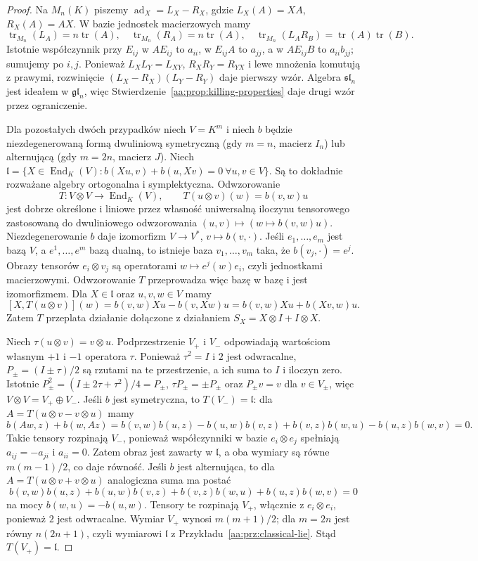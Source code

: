 \begin{proof}
Na $M_n(K)$ piszemy $\operatorname{ad}_X=L_X-R_X$,
gdzie $L_X(A)=XA$, $R_X(A)=AX$.
W bazie jednostek macierzowych mamy
\[
 \operatorname{tr}_{M_n}(L_A)=n\operatorname{tr}(A),
 \quad \operatorname{tr}_{M_n}(R_A)=n\operatorname{tr}(A),
 \quad \operatorname{tr}_{M_n}(L_A R_B)
       =\operatorname{tr}(A)\operatorname{tr}(B).
\]
Istotnie współczynnik przy $E_{ij}$ w $AE_{ij}$
to $a_{ii}$, w $E_{ij}A$ to $a_{jj}$, a w
$AE_{ij}B$ to $a_{ii}b_{jj}$; sumujemy po $i,j$.
Ponieważ $L_XL_Y=L_{XY}$, $R_XR_Y=R_{YX}$
i lewe mnożenia komutują z prawymi,
rozwinięcie $(L_X-R_X)(L_Y-R_Y)$ daje pierwszy wzór.
Algebra $\mathfrak{sl}_n$ jest ideałem w $\mathfrak{gl}_n$,
więc Stwierdzenie~\ref{aa:prop:killing-properties}
daje drugi wzór przez ograniczenie.

Dla pozostałych dwóch przypadków niech $V=K^m$
i niech $b$ będzie niezdegenerowaną formą
dwuliniową symetryczną (gdy $m=n$, macierz $I_n$)
lub alternującą (gdy $m=2n$, macierz $J$).
Niech $\mathfrak l=\{X\in\operatorname{End}_K(V):
b(Xu,v)+b(u,Xv)=0\ \forall u,v\in V\}$. Są to dokładnie rozważane
algebry ortogonalna i symplektyczna.
Odwzorowanie
\[
 T:V\otimes V\to\operatorname{End}_K(V),
 \qquad T(u\otimes v)(w)=b(v,w)u
\]
jest dobrze określone i liniowe przez własność
uniwersalną iloczynu tensorowego zastosowaną
do dwuliniowego odwzorowania $(u,v)\mapsto
(w\mapsto b(v,w)u)$. Niezdegenerowanie $b$ daje
izomorfizm $V\to V^*$, $v\mapsto b(v,\cdot)$.
Jeśli $e_1,\ldots,e_m$ jest bazą $V$, a
$e^1,\ldots,e^m$ bazą dualną, to istnieje baza
$v_1,\ldots,v_m$ taka, że $b(v_j,\cdot)=e^j$.
Obrazy tensorów $e_i\otimes v_j$ są operatorami
$w\mapsto e^j(w)e_i$, czyli jednostkami macierzowymi.
Odwzorowanie $T$ przeprowadza więc bazę w bazę
i jest izomorfizmem.
Dla $X\in\mathfrak l$ oraz $u,v,w\in V$ mamy
\[
 [X,T(u\otimes v)](w)
 = b(v,w)Xu-b(v,Xw)u
 = b(v,w)Xu+b(Xv,w)u.
\]
Zatem $T$ przeplata działanie dołączone z działaniem
$S_X=X\otimes I+I\otimes X$.

Niech $\tau(u\otimes v)=v\otimes u$.
Podprzestrzenie $V_+$ i $V_-$ odpowiadają wartościom
własnym $+1$ i $-1$ operatora $\tau$.
Ponieważ $\tau^2=I$ i $2$ jest odwracalne,
$P_\pm=(I\pm\tau)/2$ są rzutami na te przestrzenie,
a ich suma to $I$ i iloczyn zero. Istotnie
$P_\pm^2=(I\pm2\tau+\tau^2)/4=P_\pm$,
$\tau P_\pm=\pm P_\pm$ oraz $P_\pm v=v$
dla $v\in V_\pm$, więc $V\otimes V=V_+\oplus V_-$.
Jeśli $b$ jest symetryczna, to
$T(V_-)=\mathfrak l$: dla $A=T(u\otimes v-v\otimes u)$
mamy
\[
 b(Aw,z)+b(w,Az)=
 b(v,w)b(u,z)-b(u,w)b(v,z)
 +b(v,z)b(w,u)-b(u,z)b(w,v)=0.
\]
Takie tensory rozpinają $V_-$, ponieważ współczynniki
w bazie $e_i\otimes e_j$ spełniają $a_{ij}=-a_{ji}$
i $a_{ii}=0$. Zatem obraz jest zawarty w $\mathfrak l$,
a oba wymiary są równe $m(m-1)/2$, co daje równość.
Jeśli $b$ jest alternująca, to dla
$A=T(u\otimes v+v\otimes u)$ analogiczna suma ma postać
\[
 b(v,w)b(u,z)+b(u,w)b(v,z)
 +b(v,z)b(w,u)+b(u,z)b(w,v)=0
\]
na mocy $b(w,u)=-b(u,w)$. Tensory te rozpinają $V_+$,
włącznie z $e_i\otimes e_i$, ponieważ $2$ jest
odwracalne. Wymiar $V_+$ wynosi $m(m+1)/2$;
dla $m=2n$ jest równy $n(2n+1)$, czyli wymiarowi
$\mathfrak l$ z Przykładu~\ref{aa:prz:classical-lie}.
Stąd $T(V_+)=\mathfrak l$.


\end{proof}
